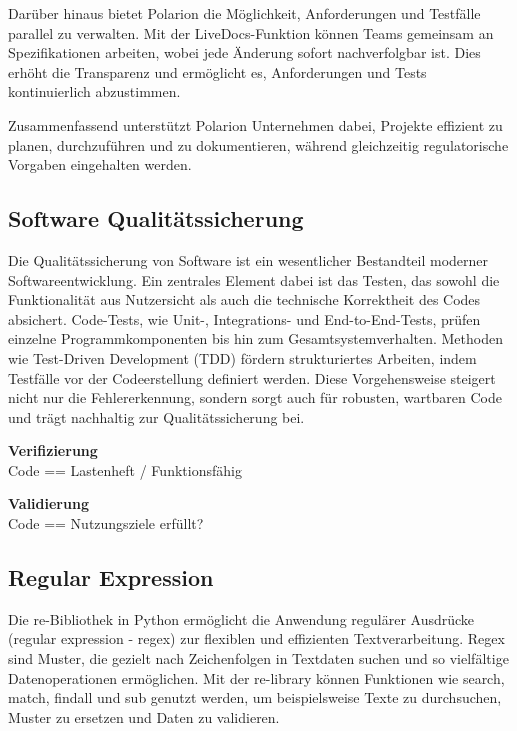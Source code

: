 \documentclass[a4paper, 12pt]{article}
\begin{document}
Darüber hinaus bietet Polarion die Möglichkeit, Anforderungen und Testfälle parallel zu verwalten. Mit der LiveDocs-Funktion können Teams gemeinsam an Spezifikationen arbeiten, wobei jede Änderung sofort nachverfolgbar ist. Dies erhöht die Transparenz und ermöglicht es, Anforderungen und Tests kontinuierlich abzustimmen.

Zusammenfassend unterstützt Polarion Unternehmen dabei, Projekte effizient zu planen, durchzuführen und zu dokumentieren, während gleichzeitig regulatorische Vorgaben eingehalten werden. \cite{polarion_web}


\subsection{Software Qualitätssicherung}
Die Qualitätssicherung von Software ist ein wesentlicher Bestandteil moderner Softwareentwicklung. Ein zentrales Element dabei ist das Testen, das sowohl die Funktionalität aus Nutzersicht als auch die technische Korrektheit des Codes absichert. Code-Tests, wie Unit-, Integrations- und End-to-End-Tests, prüfen einzelne Programmkomponenten bis hin zum Gesamtsystemverhalten. Methoden wie Test-Driven Development (TDD) fördern strukturiertes Arbeiten, indem Testfälle vor der Codeerstellung definiert werden. Diese Vorgehensweise steigert nicht nur die Fehlererkennung, sondern sorgt auch für robusten, wartbaren Code und trägt nachhaltig zur Qualitätssicherung bei. \cite{grundlagen_sw_entwicklung}

\textbf{Verifizierung}\\
Code == Lastenheft / Funktionsfähig %

\textbf{Validierung}\\
Code == Nutzungsziele erfüllt? %



\subsection{Regular Expression}\label{regularExpression}
Die re-Bibliothek in Python ermöglicht die Anwendung regulärer Ausdrücke (regular expression - regex) zur flexiblen und effizienten Textverarbeitung. Regex sind Muster, die gezielt nach Zeichenfolgen in Textdaten suchen und so vielfältige Datenoperationen ermöglichen. Mit der re-library können Funktionen wie search, match, findall und sub genutzt werden, um beispielsweise Texte zu durchsuchen, Muster zu ersetzen und Daten zu validieren. \cite{regex_lib}
\end{document}
